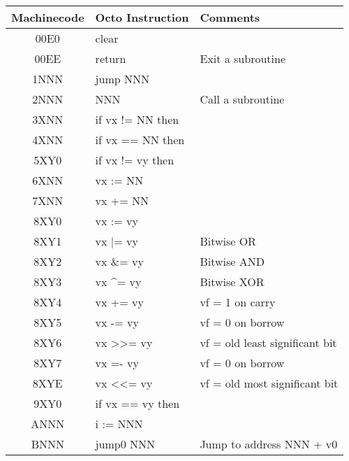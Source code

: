 \documentclass{article}
\begin{document}
\begin{center}
		\large
		\ttfamily
		\begin{tabular}{| c | l | l |}
			\hline
			\textnormal{{Machinecode}} &
			\textnormal{{Octo Instruction}} &
			\textnormal{{Comments}}\\
			\hline
			00E0                      & clear                   & \\
			00EE                      & return                  & \textnormal{Exit a subroutine} \\
			1NNN                      & jump NNN                & \\
			2NNN                      & NNN                     & \textnormal{Call a subroutine} \\
			3XNN                      & if vx != NN then        & \\
			4XNN                      & if vx == NN then        & \\
			5XY0                      & if vx != vy then        & \\
			6XNN                      & vx := NN                & \\
			7XNN                      & vx += NN                & \\
			8XY0                      & vx := vy                & \\
			8XY1                      & vx |= vy                & \textnormal{Bitwise OR} \\
			8XY2                      & vx \&= vy               & \textnormal{Bitwise AND} \\
			8XY3                      & vx \textasciicircum= vy & \textnormal{Bitwise XOR} \\
			\rowcolor[gray]{0.8} 8XY4 & vx += vy                & \textnormal{vf = 1 on carry} \\
			\rowcolor[gray]{0.8} 8XY5 & vx -= vy                & \textnormal{vf = 0 on borrow} \\
			\rowcolor[gray]{0.8} 8XY6 & vx >>= vy               & \textnormal{vf = old least significant bit} \\
			\rowcolor[gray]{0.8} 8XY7 & vx =- vy                & \textnormal{vf = 0 on borrow} \\
			\rowcolor[gray]{0.8} 8XYE & vx <<= vy               & \textnormal{vf = old most significant bit} \\
			9XY0                      & if vx == vy then        & \\
			ANNN                      & i := NNN                & \\
			BNNN                      & jump0 NNN               & \textnormal{Jump to address NNN + v0} \\

\end{tabular}
\end{center}
\end{document}
